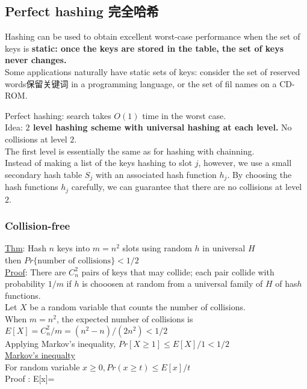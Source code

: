 \documentclass{article}
\begin{document}
\subsection{Perfect hashing 完全哈希}
Hashing can be used to obtain excellent worst-case performance when the set of keys is \textbf{static: once the keys are stored in the table, the set of keys never changes.}\\
Some applications naturally have static sets of keys: consider the set of reserved words保留关键词 in a programming language, or the set of fil names on a CD-ROM.

Perfect hashing: search takes $O(1)$ time in the worst case.\\
Idea: \textbf{$2$ level hashing scheme with universal hashing at each level.} No collisions at level $2$.\\
The first level is essentially the same as for hashing with chainning.\\
Instead of making a list of the keys hashing to slot $j$, however, we use a small secondary hash table $S_j$ with an associated hash function $h_j$. By choosing the hash functions $h_j$ carefully, we can guarantee that there are no collisions at level $2$.\\

\subsubsection{Collision-free}
\underline{Thm}: Hash $n$ keys into $m=n^2$ slots using random $h$ in universal $H$\\
then $Pr\{\text{number of collisions}\}< 1/2$\\
\underline{Proof}: There are $C_n^2$ pairs of keys that may collide; each pair collide with probability $1/m$ if $h$ is chooosen at random from a universal family of $H$ of has$h$ functions.\\
Let $X$ be a random variable that counts the number of collisions.\\
When $m=n^2$, the expected number of collisions is\\
$E[X]=C_n^2 /m=(n^2 - n)/(2n^2) < 1/2$\\
Applying Markov's inequality, $Pr[X \geq 1] \leq E[X]/1 < 1/2$\\

\underline{Markov's inequalty}\\
For random variable $x \geq 0, Pr(x \geq t) \leq E[x]/t$\\
Proof : E[x]=
\end{document}
